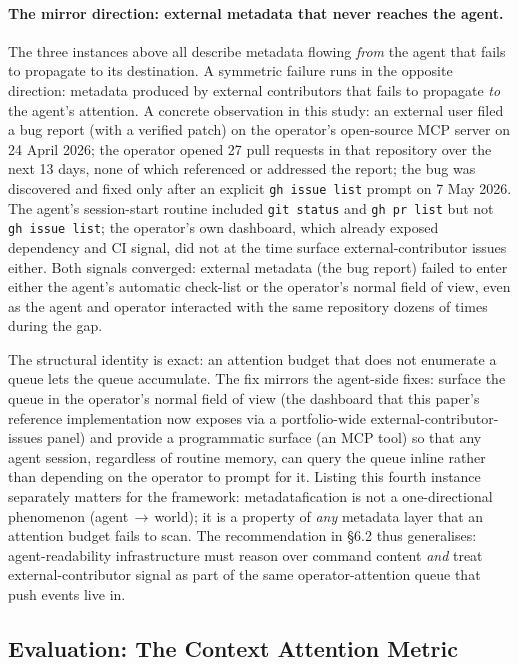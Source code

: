 \documentclass[12pt]{article}
\begin{document}
\paragraph{The mirror direction: external metadata that never reaches the agent.}
The three instances above all describe metadata flowing \textit{from} the agent that fails to propagate to its destination. A symmetric failure runs in the opposite direction: metadata produced by external contributors that fails to propagate \textit{to} the agent's attention. A concrete observation in this study: an external user filed a bug report (with a verified patch) on the operator's open-source MCP server on 24 April 2026; the operator opened 27 pull requests in that repository over the next 13 days, none of which referenced or addressed the report; the bug was discovered and fixed only after an explicit \texttt{gh issue list} prompt on 7 May 2026. The agent's session-start routine included \texttt{git status} and \texttt{gh pr list} but not \texttt{gh issue list}; the operator's own dashboard, which already exposed dependency and CI signal, did not at the time surface external-contributor issues either. Both signals converged: external metadata (the bug report) failed to enter either the agent's automatic check-list or the operator's normal field of view, even as the agent and operator interacted with the same repository dozens of times during the gap.

The structural identity is exact: an attention budget that does not enumerate a queue lets the queue accumulate. The fix mirrors the agent-side fixes: surface the queue in the operator's normal field of view (the dashboard that this paper's reference implementation now exposes via a portfolio-wide external-contributor-issues panel) and provide a programmatic surface (an MCP tool) so that any agent session, regardless of routine memory, can query the queue inline rather than depending on the operator to prompt for it. Listing this fourth instance separately matters for the framework: metadatafication is not a one-directional phenomenon (agent\,$\to$\,world); it is a property of \textit{any} metadata layer that an attention budget fails to scan. The recommendation in §6.2 thus generalises: agent-readability infrastructure must reason over command content \textit{and} treat external-contributor signal as part of the same operator-attention queue that push events live in.

\subsection{Evaluation: The Context Attention Metric}
\end{document}
